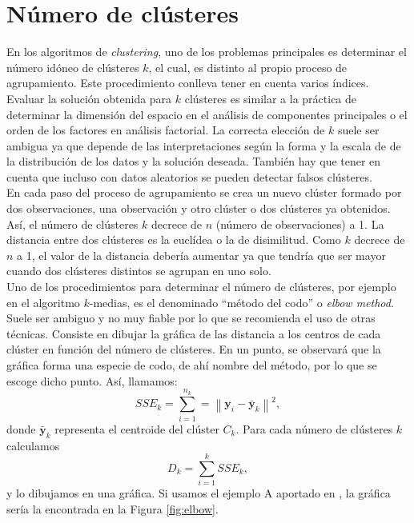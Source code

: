 \documentclass[a4paper, 20pt]{article}
\newcommand{\norm}[1]{\left\lVert#1\right\rVert}
\newcommand{\yy}{\textbf{y}}
\begin{document}
\section{Número de clústeres}\label{sec:num}
En los algoritmos de \textit{clustering}, uno de los problemas principales es determinar el número idóneo de clústeres $ k $, el cual, es distinto al propio proceso de agrupamiento. Este procedimiento conlleva tener en cuenta varios índices. Evaluar la solución obtenida para $ k $ clústeres es similar a la práctica de determinar la dimensión del espacio en el análisis de componentes principales o el orden de los factores en análisis factorial.
La correcta elección de $ k $ suele ser ambigua ya que depende de las interpretaciones según la forma y la escala de de la distribución de los datos y la solución deseada. También hay que tener en cuenta que incluso con datos aleatorios se pueden detectar falsos clústeres. \\

En cada paso del proceso de agrupamiento se crea un nuevo clúster formado por dos observaciones, una observación y otro clúster o dos clústeres ya obtenidos. Así, el número de clústeres $ k $ decrece de $ n $ (número de observaciones) a 1. La distancia entre dos clústeres es la euclídea o la de disimilitud. %
Como $ k $ decrece de $ n $ a 1, el valor de la distancia debería aumentar ya que tendría que ser mayor cuando dos clústeres distintos se agrupan en uno solo. \\

Uno de los procedimientos para determinar el número de clústeres, por ejemplo en el algoritmo $ k$-medias, es el denominado ``método del codo'' o \textit{elbow method}. Suele ser ambiguo y no muy fiable por lo que se recomienda el uso de otras técnicas. Consiste en dibujar la gráfica de las distancia a los centros de cada clúster en función del número de clústeres. En un punto, se observará que la gráfica forma una especie de codo, de ahí nombre del método, por lo que se escoge dicho punto. Así, llamamos:\\
\[
SSE_k = \sum_{i = 1}^{n_k} = \norm{\yy_i - \bar{\yy}_k}^2,
\]
donde $ \bar{\yy}_k $ representa el centroide del clúster $ C_k $. Para cada número de clústeres $ k $ calculamos 
\[
D_k = \sum_{i = 1} ^ {k} SSE_k,
\]
y lo dibujamos en una gráfica. Si usamos el ejemplo A aportado en \cite{elbowGraph}, la gráfica sería la encontrada en la Figura \ref{fig:elbow}.
\end{document}
